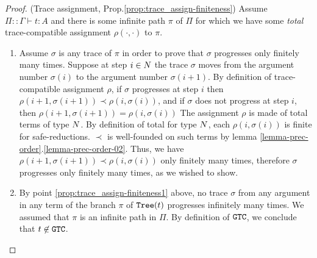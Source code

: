 


\begin{proof}(Trace assignment, Prop.\ref{prop:trace_assign-finiteness})
Assume $\Pi::\Gamma \vdash t:A$ and there is some infinite path $\pi$ of $\Pi$ for which we 
have some \emph{total} trace-compatible assignment  $\rho(\cdot,\cdot)$ to $\pi$.
\begin{enumerate}
\item
Assume $\sigma$ is any trace of $\pi$ in order to prove
that $\sigma$ progresses only finitely many times.
Suppose at step $i \in {N}$ the trace $\sigma$ moves from the argument number 
$\sigma(i)$ to the argument number $\sigma(i+1)$.
By definition of trace-compatible assignment $\rho$, if $\sigma$ progresses at step $i$
then $\rho(i+1,\sigma(i+1))\prec \rho(i,\sigma(i))$, and if $\sigma$ 
does not progress at step $i$,  then  $\rho(i+1,\sigma(i+1)) = \rho(i,\sigma(i))$
The assignment $\rho$ is made of total terms of type ${N}$.
By definition of total for type ${N}$, each $\rho(i,\sigma(i))$ is finite for safe-reductions. 
$\prec$ is well-founded on such terms
by lemma \ref{lemma-prec-order}.\ref{lemma-prec-order-02}.
Thus, we have $\rho(i+1,\sigma(i+1))\prec \rho(i,\sigma(i))$ only finitely many times, 
therefore $\sigma$ progresses only finitely many times, as we wished to show.

\item
By point \ref{prop:trace_assign-finiteness1} above, no trace $\sigma$ 
from any argument in any term of the branch $\pi$ of ${\tt Tree}(t)$ progresses infinitely many 
times. We assumed that $\pi$ is an infinite path in $\Pi$.
By definition of ${\tt GTC}$, we conclude that $t \not \in {\tt GTC}$. 
\end{enumerate}
\end{proof}


